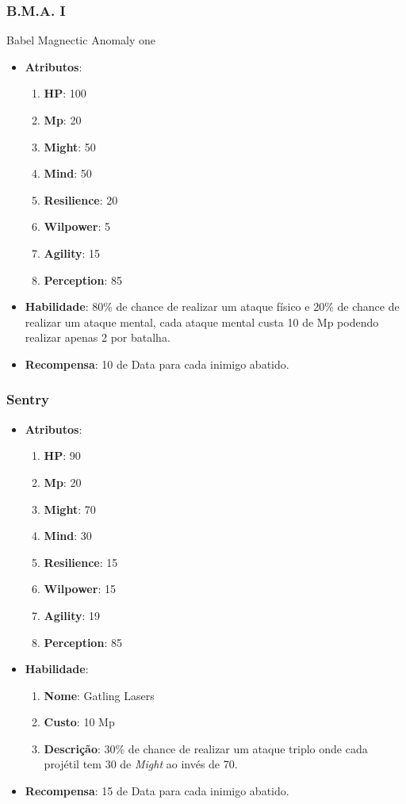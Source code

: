 \documentclass[11pt]{article} %
\begin{document}
\subsubsection{B.M.A. I} Babel Magnectic Anomaly one
\begin{itemize}
\item \textbf{Atributos}:
  \begin{enumerate}
    \item \textbf{HP}: 100
    \item \textbf{Mp}: 20
    \item \textbf{Might}: 50
    \item \textbf{Mind}: 50
    \item \textbf{Resilience}: 20
    \item \textbf{Wilpower}: 5
    \item \textbf{Agility}: 15
    \item \textbf{Perception}: 85
  \end{enumerate}
\item \textbf{Habilidade}: 80\% de chance de realizar um ataque físico e 20\% de chance de realizar um ataque mental, cada ataque mental custa 10 de Mp podendo realizar apenas 2 por batalha.
\item \textbf{Recompensa}: 10 de Data para cada inimigo abatido.
\end{itemize}

\subsubsection{Sentry}

\begin{itemize}
\item \textbf{Atributos}:
  \begin{enumerate}
    \item \textbf{HP}: 90
    \item \textbf{Mp}: 20
    \item \textbf{Might}: 70
    \item \textbf{Mind}: 30
    \item \textbf{Resilience}: 15
    \item \textbf{Wilpower}: 15
    \item \textbf{Agility}: 19
    \item \textbf{Perception}: 85
  \end{enumerate}
\item \textbf{Habilidade}:
  \begin{enumerate}
    \item \textbf{Nome}: Gatling Lasers
    \item \textbf{Custo}: 10 Mp
    \item \textbf{Descrição}: 30\% de chance de realizar um ataque triplo onde cada projétil tem 30 de \textit{Might} ao invés de 70.
  \end{enumerate}
\item \textbf{Recompensa}: 15 de Data para cada inimigo abatido.
\end{itemize}
\end{document}
